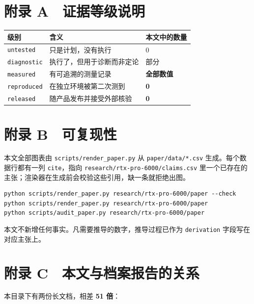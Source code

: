 \section{附录 A　证据等级说明}

\begin{table}[t]
\centering
\footnotesize
\setlength{\tabcolsep}{4pt}
\label{tab:25}
\begin{tabular}{lll}
\toprule
级别 & 含义 & 本文中的数量 \\
\midrule
\texttt{untested} & 只是计划，没有执行 & 0 \\
\texttt{diagnostic} & 执行了，但用于诊断而非定论 & 部分 \\
\texttt{measured} & 有可追溯的测量记录 & \textbf{全部数值} \\
\texttt{reproduced} & 在独立环境被第二次测到 & \textbf{0} \\
\texttt{released} & 随产品发布并接受外部核验 & \textbf{0} \\
\bottomrule
\end{tabular}
\end{table}

\section{附录 B　可复现性}

本文全部图表由 \texttt{scripts/render\_paper.py} 从 \texttt{paper/data/*.csv} 生成。每个数据行都有一列 \texttt{cite}，指向 \texttt{research/rtx-pro-6000/claims.csv} 里一个已存在的主张；渲染器在生成前会校验这些引用，缺一条就拒绝出图。


\begin{lstlisting}
python scripts/render_paper.py research/rtx-pro-6000/paper --check
python scripts/render_paper.py research/rtx-pro-6000/paper
python scripts/audit_paper.py research/rtx-pro-6000/paper
\end{lstlisting}

本文不新增任何事实。凡需要推导的数字，推导过程已作为 \texttt{derivation} 字段写在对应主张上。



\section{附录 C　本文与档案报告的关系}

本目录下有两份长文档，相差 \textbf{51 倍}：


